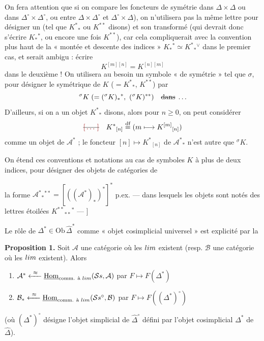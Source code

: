 \documentclass[11pt,a4paper]{article}
\begin{document}
On fera attention que si on compare  les foncteurs de symétrie
 
dans $\Delta \times \Delta$ ou dans $\Delta^{\circ} \times \Delta^{\circ}$, ou entre
$\Delta \times \Delta^{\circ}$ et $\Delta^{\circ} \times \Delta$), on n'utilisera pas
la même lettre pour désigner un   (tel que $K^{*}{}_{*}$
ou $K^{**}$ disons) et son transformé (qui devrait donc s'écrire $K_{*}{}^{*}$, ou
encore une fois $K^{**}$), car cela compliquerait avec la convention plus haut de la
« montée et descente des indices »
$K_{*}{}^{*} \simeq K^{*}{}_{*}{}^{\vee}$ dans le premier cas, et serait
\struck{\ill{}} ambigu : écrire
\[
  K^{[m][n]} = K^{[n][m]}
\]
dans le deuxième ! On utilisera au besoin un symbole « de symétrie » tel que
$\sigma$, pour désigner le symétrique de $K$ ($= K^{*}{}_{*}$, $K^{**}$) par
\[
  {}^{\sigma}K \;(= ({}^{\sigma}K)_{*}{}^{*},\ ({}^{\sigma}K)^{**}) \quad \text{\struck{dans}} \;\ldots
\]
D'ailleurs,  
si on a un objet $K^{*}{}_{*}$ disons, alors pour $n \geqslant 0$, on peut considérer
\[
  \text{\struck{\ill{}}} \quad K^{*}{}_{[n]} \overset{\text{df}}{=} (m \longmapsto K^{[m]}{}_{[n]})
\]
comme un objet de $\mathcal{A}^{*}$ ; le foncteur $[n] \longmapsto K^{*}{}_{[n]}$
de $\mathcal{A}^{*}{}_{*}$ n'est autre que ${}^{\sigma}K$.

On étend ces conventions et notations au cas de symboles $K$ à plus de deux indices,
pour désigner des objets de catégories de

la forme $\mathcal{A}^{*}{}_{*}{}^{**} = [((\mathcal{A}^{*})_{*})^{*}]^{*}$ \struck{\ill{}} p.ex.
--- dans lesquels les objets sont notés  des lettres étoilées
$K^{**}{}_{**}{}^{*}$ --- ]

Le rôle de $\Delta^{*} \in \mathrm{Ob}\,\widehat{\Delta}^{*}$ comme « objet
cosimplicial universel » est explicité par la

\textbf{Proposition 1.} Soit $\mathcal{A}$ une catégorie où les $\varinjlim$
existent (resp. $\mathcal{B}$ une catégorie où les $\varprojlim$ existent). Alors
\begin{enumerate}
  \item[a)] $\mathcal{A}^{*} \xleftarrow{\ \approx\ } \underline{\mathrm{Hom}}_{\text{comm. à } \varinjlim}(\mathcal{S}s, \mathcal{A})$
  par $F \longmapsto F(\Delta^{*})$
  \item[b)] $\mathcal{B}_{*} \xleftarrow{\ \approx\ } \underline{\mathrm{Hom}}_{\text{comm. à } \varprojlim}(\mathcal{S}s^{\circ}, \mathcal{B})$
  par $F \longmapsto F((\Delta^{*})^{\circ})$
\end{enumerate}
(où $(\Delta^{*})^{\circ}$ désigne l'objet simplicial de $\widehat{\Delta}^{\circ}$
défini par l'objet cosimplicial $\Delta^{*}$ de $\widehat{\Delta}$).
\end{document}
